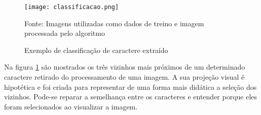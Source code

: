 \begin{figure}[H]
	\centering
	\texttt{[image: classificacao.png]}
	\caption{Exemplo de classificação de caractere extraído}
Fonte: Imagens utilizadas como dados de treino e imagem processada pelo algoritmo
	\label{fig:classificacao}
\end{figure}

Na figura \ref{fig:classificacao} são mostrados os três vizinhos mais próximos de um determinado caractere retirado do processamento de uma imagem. A sua projeção visual é hipotética e foi criada para representar de uma forma mais didática a seleção dos vizinhos. Pode-se reparar a semelhança entre os caracteres e entender porque eles foram selecionados ao visualizar a imagem.